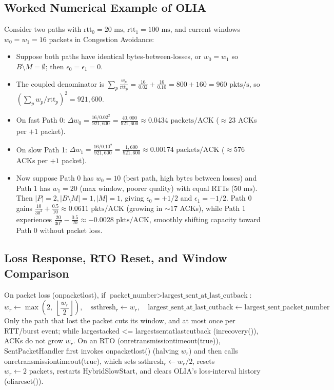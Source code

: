 \documentclass[10pt,a4paper]{article}
\newcommand{\codeul}{\textunderscore\hspace{0pt}}
\DeclareRobustCommand{\code}[1]{{\ttfamily\let\_\codeul #1}}
\begin{document}
\subsection{Worked Numerical Example of OLIA}
Consider two paths with $\text{rtt}_0 = 20\text{ ms}$, $\text{rtt}_1 = 100\text{ ms}$, and current windows $w_0 = w_1 = 16\text{ packets}$ in Congestion Avoidance:
\begin{itemize}
    \item Suppose both paths have identical bytes-between-losses, or $w_0 = w_1$ so $B \setminus M = \emptyset$; then $\epsilon_0 = \epsilon_1 = 0$.
    \item The coupled denominator is $\sum_p \frac{w_p}{\text{rtt}_p} = \frac{16}{0.02} + \frac{16}{0.10} = 800 + 160 = 960\text{ pkts/s}$, so $(\sum_p w_p/\text{rtt}_p)^2 = 921{,}600$.
    \item On fast Path 0: $\Delta w_0 = \frac{16 / 0.02^2}{921{,}600} = \frac{40{,}000}{921{,}600} \approx 0.0434\text{ packets/ACK}$ ($\approx 23$ ACKs per $+1$ packet).
    \item On slow Path 1: $\Delta w_1 = \frac{16 / 0.10^2}{921{,}600} = \frac{1{,}600}{921{,}600} \approx 0.00174\text{ packets/ACK}$ ($\approx 576$ ACKs per $+1$ packet).
    \item Now suppose Path 0 has $w_0 = 10$ (best path, high bytes between losses) and Path 1 has $w_1 = 20$ (max window, poorer quality) with equal RTTs ($50\text{ ms}$). Then $|P|=2, |B\setminus M|=1, |M|=1$, giving $\epsilon_0 = +1/2$ and $\epsilon_1 = -1/2$. Path 0 gains $\frac{10}{30^2} + \frac{0.5}{10} \approx 0.0611\text{ pkts/ACK}$ (growing in $\sim 17$ ACKs), while Path 1 experiences $\frac{20}{30^2} - \frac{0.5}{20} \approx -0.0028\text{ pkts/ACK}$, smoothly shifting capacity toward Path 0 without packet loss.
\end{itemize}

\subsection{Loss Response, RTO Reset, and Window Comparison}
On packet loss (\code{on\_packet\_lost}), if $\text{packet\_number} > \text{largest\_sent\_at\_last\_cutback}$:
\begin{equation}
    w_r \leftarrow \max\!\left(2,\; \left\lfloor\frac{w_r}{2}\right\rfloor\right), \quad \text{ssthresh}_r \leftarrow w_r, \quad \text{largest\_sent\_at\_last\_cutback} \leftarrow \text{largest\_sent\_packet\_number}
\end{equation}
Only the path that lost the packet cuts its window, and at most once per RTT/burst event; while \code{largest\_acked <= largest\_sent\_at\_last\_cutback} (\code{in\_recovery()}), ACKs do not grow $w_r$. On an RTO (\code{on\_retransmission\_timeout(true)}), \code{SentPacketHandler} first invokes \code{on\_packet\_lost()} (halving $w_r$) and then calls \code{on\_retransmission\_timeout(true)}, which sets $\text{ssthresh}_r \leftarrow w_r / 2$, resets $w_r \leftarrow 2\text{ packets}$, restarts \code{HybridSlowStart}, and clears OLIA's loss-interval history (\code{olia\_reset()}).
\end{document}
